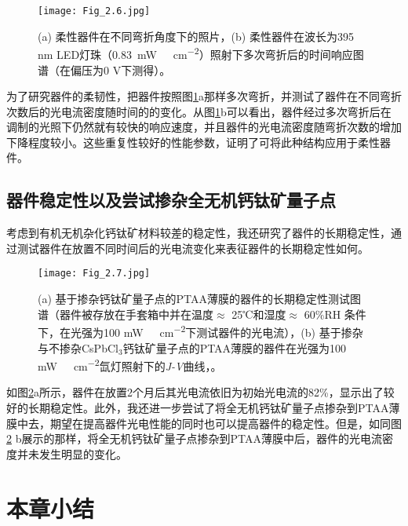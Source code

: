 \documentclass[forlib]{WHUMaster}   %
\begin{document}
{\begin{figure}[ht]
\centering
  \texttt{[image: Fig\_2.6.jpg]}
  \caption{\rm (a) 柔性器件在不同弯折角度下的照片，(b) 柔性器件在波长为395 nm LED灯珠（0.83\ \si{mW\ cm^{-2}}）照射下多次弯折后的时间响应图谱（在偏压为0 \si{V}下测得）。}
  \label{fig:2.6}
\end{figure}

为了研究器件的柔韧性，把器件按照图\ref{fig:2.6}a那样多次弯折，并测试了器件在不同弯折次数后的光电流密度随时间的的变化。从图\ref{fig:2.6}b可以看出，器件经过多次弯折后在调制的光照下仍然就有较快的响应速度，并且器件的光电流密度随弯折次数的增加下降程度较小。这些重复性较好的性能参数，证明了可将此种结构应用于柔性器件。

\subsection{器件稳定性以及尝试掺杂全无机钙钛矿量子点}

考虑到有机无机杂化钙钛矿材料较差的稳定性，我还研究了器件的长期稳定性，通过测试器件在放置不同时间后的光电流变化来表征器件的长期稳定性如何。

\begin{figure}[htb]
\centering
  \texttt{[image: Fig\_2.7.jpg]}
  \caption{\rm (a) 基于掺杂钙钛矿量子点的PTAA薄膜的器件的长期稳定性测试图谱（器件被存放在手套箱中并在温度$\approx$ 25℃和湿度$\approx$ 60{\%}RH 条件下，在光强为100 \si{mW\ cm^{-2}}下测试器件的光电流），(b) 基于掺杂与不掺杂CsPbCl$_3$钙钛矿量子点的PTAA薄膜的器件在光强为100 \si{mW\ cm^{-2}}氙灯照射下的\emph{J-V}曲线，。}
  \label{fig:2.7}
\end{figure}

如图\ref{fig:2.7}a所示，器件在放置2个月后其光电流依旧为初始光电流的82\%，显示出了较好的长期稳定性。此外，我还进一步尝试了将全无机钙钛矿量子点掺杂到PTAA薄膜中去，期望在提高器件光电性能的同时也可以提高器件的稳定性。但是，如同图\ref{fig:2.7} b展示的那样，将全无机钙钛矿量子点掺杂到PTAA薄膜中后，器件的光电流密度并未发生明显的变化。


\section{本章小结}

}
\end{document}
